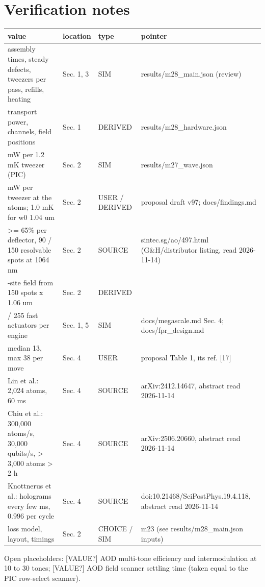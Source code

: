 \hypertarget{verification-notes}{%
\section{Verification notes}\label{aod_comparison-verification-notes}}

{\footnotesize
\begin{longtable}[]{@{}>{\raggedright\arraybackslash}p{0.306\dimexpr(\linewidth-8\tabcolsep)\relax}>{\raggedright\arraybackslash}p{0.112\dimexpr(\linewidth-8\tabcolsep)\relax}>{\raggedright\arraybackslash}p{0.097\dimexpr(\linewidth-8\tabcolsep)\relax}>{\raggedright\arraybackslash}p{0.485\dimexpr(\linewidth-8\tabcolsep)\relax}@{}}
\toprule\noalign{}
value & location & type & pointer \\
\midrule\noalign{}
\endhead
\bottomrule\noalign{}
\endlastfoot
assembly times, steady defects, tweezers per pass, refills, heating &
Sec. 1, 3 & SIM & results/m28\_main.json (review) \\
transport power, channels, field positions & Sec. 1 & DERIVED &
results/m28\_hardware.json \\
57.7 mW per 1.2 mK tweezer (PIC) & Sec. 2 & SIM &
results/m27\_wave.json \\
6.6 mW per tweezer at the atoms; 1.0 mK for w0 1.04 um & Sec. 2 & USER /
DERIVED & proposal draft v97; docs/findings.md \\
\textgreater= 65\% per deflector, 90 / 150 resolvable spots at 1064 nm &
Sec. 2 & SOURCE & sintec.sg/ao/497.html (G\&H/distributor listing, read
2026-11-14) \\
40-site field from 150 spots x 1.06 um & Sec. 2 & DERIVED & \\
383 / 255 fast actuators per engine & Sec. 1, 5 & SIM &
docs/megascale.md Sec. 4; docs/fpr\_design.md \\
median 13, max 38 per move & Sec. 4 & USER & proposal Table 1, its ref.
{[}17{]} \\
Lin et al.: 2,024 atoms, 60 ms & Sec. 4 & SOURCE & arXiv:2412.14647,
abstract read 2026-11-14 \\
Chiu et al.: 300,000 atoms/s, 30,000 qubits/s, \textgreater{} 3,000
atoms \textgreater{} 2 h & Sec. 4 & SOURCE & arXiv:2506.20660, abstract
read 2026-11-14 \\
Knottnerus et al.: holograms every few ms, 0.996 per cycle & Sec. 4 &
SOURCE & doi:10.21468/SciPostPhys.19.4.118, abstract read 2026-11-14 \\
loss model, layout, timings & Sec. 2 & CHOICE / SIM & m23 (see
results/m28\_main.json inputs) \\
\end{longtable}
}

Open placeholders: {[}VALUE?{]} AOD multi-tone efficiency and
intermodulation at 10 to 30 tones; {[}VALUE?{]} AOD field scanner
settling time (taken equal to the PIC row-select scanner).
